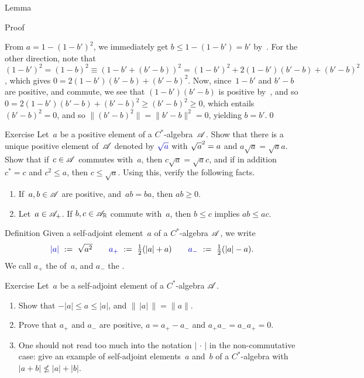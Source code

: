 \documentclass[a]{subfiles}
\begin{document}
\begin{parsec}
\begin{point}{Lemma}
\begin{point}{Proof}
\begin{point}
\begin{point}
From $a=1-(1-b')^2$,
we immediately get $b \leq 1-(1-b')=b'$ by~.
For the other direction,
note that
$(1-b')^2= (1-b)^2 \equiv (1-b'+(b'-b))^2 = (1-b')^2+2(1-b')(b'-b)+(b'-b)^2$,
which gives $0=2(1-b')(b'-b)+(b'-b)^2$.
Now, since~$1-b'$ and $b'-b$ are positive,
and commute, we see that $(1-b')(b'-b)$ is positive 
by~, and so 
 $0=2(1-b')(b'-b)+(b'-b)^2\geq (b'-b)^2 \geq 0$,
which entails $(b'-b)^2=0$, and so $\|(b'-b)^2\|=\|b'-b\|^2=0$,
yielding $b=b'$.\qed
\end{point}
\end{point}
\end{point}
\end{point}
\begin{point}[sqrt]{Exercise}%
Let~$a$ be a positive element of a $C^*$-algebra~$\mathscr{A}$.
Show that there is a unique 
positive element of~$\mathscr{A}$
denoted by $\Define{\sqrt{a}}$ with $\smash{\sqrt{a}^2}=a$
and $a\sqrt{a}=\sqrt{a}a$.
Show that if~$c\in\mathscr{A}$ commutes with~$a$,
then $c\sqrt{a}=\sqrt{a}c$,
and if in addition $c^*=c$ and $c^2\leq a$,
then $c\leq \sqrt{a}$.
Using this, verify the following facts.
\begin{enumerate}
\item
If~$a,b\in \mathscr{A}$ are positive,
and~$ab=ba$,
then $ab\geq 0$.

\item
Let~$a\in\mathscr{A}_{+}$.
If $b,c\in \mathscr{A}_{\mathbb{R}}$ commute with~$a$,
then $b\leq c$ implies $ab\leq ac$.
\end{enumerate}
\end{point}
\begin{point}{Definition}
Given a self-adjoint element~$a$ of a $C^*$-algebra $\mathscr{A}$,
we write
\begin{equation*}
\textstyle
\Define{\left|a\right|}\ :=\ \sqrt{a^2}
\qquad
\Define{\pos{a}}\ :=\ \frac{1}{2}(\left|a\right| + a)
\qquad
\Define{a_{-}}\ :=\ \frac{1}{2}(\left|a\right| - a).
\end{equation*}
We call $a_+$ the  of~$a$,
and $a_-$ the .
\end{point}
\begin{point}{Exercise}%
Let~$a$ be a self-adjoint element of a
 $C^*$-algebra $\mathscr{A}$.
\begin{enumerate}
\item
Show that $-\left|a\right| \leq a \leq \left| a \right|$,
and $\|\,\left|a\right|\,\|= \|a\|$.
\item
Prove that $a_+$ and $a_-$ are positive,  $a=a_+-a_-$
and $a_+a_-=a_-a_+=0$.
\item
One should not read too much into the notation
$\left|\,\cdot\,\right|$
in the non-commutative case:
give an example of
self-adjoint elements~$a$ and~$b$ of a $C^*$-algebra with
 $\left|a+b\right|\nleq \left|a\right|+ \left|b\right|$.


\end{enumerate}
\end{point}
\end{parsec}
\end{document}
